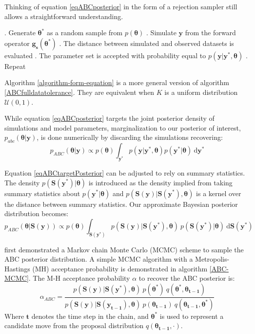 Thinking of equation \ref{eqABCposterior} in the form of a rejection sampler still allows a straightforward understanding.
\begin{algorithm}[H]
	\caption{ }
	\begin{algorithmic}
		. Generate $\bm{\theta^*}$ as a random sample from $p(\bm{\theta})$		
		. Simulate $\bm{y}$ from the forward operator $\bm{g_s}(\bm{\theta^*})$		
		. The distance between simulated and observed datasets is evaluated		
		. The parameter set is accepted with probability equal to $p(\bm{y}|\bm{y^*},\bm{\theta})$	
		. Repeat
	\end{algorithmic}
	\label{algorithm-form-equation}
\end{algorithm}
Algorithm \ref{algorithm-form-equation} is a more general version of algorithm \ref{ABCfulldatatolerance}. They are equivalent when $K$ is a uniform distribution $\mathcal{U}(0,1)$.\par
While equation \ref{eqABCposterior} targets the joint posterior density of simulations and model parameters, marginalization to our posterior of interest, $p_{abc}(\bm{\theta}|\bm{y})$, is done numerically by discarding the simulations recovering:
\begin{equation}
p_{ABC}(\bm{\theta}|\bm{y}) \propto p(\bm{\theta}) \int_{\bm{y^*}} p(\bm{y}|\bm{y^*},\bm{\theta}) p(\bm{y^*}|\bm{\theta})\ \text{d}\bm{y^*}
\label{eqABCtargetPosterior}
\end{equation}\par

Equation \ref{eqABCtargetPosterior} can be adjusted to rely on summary statistics. The density $p(\bm{S}(\bm{y^*})|\bm{\theta})$ is introduced as the density implied from taking summary statistics about $p(\bm{y^*}|\bm{\theta})$ and $p(\bm{S}(\bm{y})|\bm{S}(\bm{y^*}),\bm{\theta})$ is a kernel over the distance between summary statistics. Our approximate Bayesian posterior distribution becomes:
\begin{equation}
p_{ABC}(\bm{\theta}|\bm{S}(\bm{y})) \propto p(\bm{\theta}) \int_{\bm{S}(\bm{y^*})} p(\bm{S}(\bm{y})|\bm{S}(\bm{y^*}),\bm{\theta})\  p(\bm{S}(\bm{y^*})|\bm{\theta})\ \text{d}\bm{S}(\bm{y^*})
\label{summary-stat-abc-posterior}
\end{equation}

\citet{Marjoram2003} first demonstrated a Markov chain Monte Carlo (MCMC) scheme to sample the ABC posterior distribution. A simple MCMC algorithm with a Metropolis-Hastings (MH) acceptance probability is demonstrated in algorithm \ref{ABC-MCMC}. The M-H acceptance probability $\alpha$ to recover the ABC posterior is:
\begin{equation}
\alpha_{ABC} = \frac{p(\bm{S}(\bm{y})|\bm{S}(\bm{y^*}),\bm{\theta})\ p(\bm{\theta^*})\ q(\bm{\theta^*},\bm{\theta_{t-1}})} {p(\bm{S}(\bm{y})|\bm{S}(\bm{y_{t-1}}),\bm{\theta})\ p(\bm{\theta_{t-1}})\ q(\bm{\theta_{t-1}},\bm{\theta^*})}
\label{M-H-acce}
\end{equation}
Where $\bm{t}$ denotes the time step in the chain, and $\bm{\theta^*}$ is used to represent a candidate move from the proposal distribution $q(\bm{\theta_{t-1}},\cdot)$.

